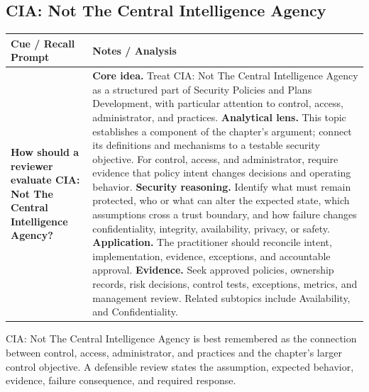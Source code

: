 \documentclass[11pt]{article}
\newcommand{\CornellHeader}{%
\rowcolor{Navy}\color{white}\bfseries Cue / Recall Prompt & \color{white}\bfseries Notes / Analysis\\\hline}
\newcommand{\CornellRow}[2]{%
\cellcolor{CueGray}\RaggedRight\textbf{#1} & \RaggedRight #2\\\hline}
\begin{document}
\subsection*{CIA: Not The Central Intelligence Agency}
\begin{longtable}{>{\RaggedRight\arraybackslash}p{}|>{\RaggedRight\arraybackslash}p{}}
\CornellHeader
\CornellRow{How should a reviewer evaluate CIA: Not The Central Intelligence Agency?}{\textbf{Core idea.} Treat CIA: Not The Central Intelligence Agency as a structured part of Security Policies and Plans Development, with particular attention to control, access, administrator, and practices. \textbf{Analytical lens.} This topic establishes a component of the chapter's argument; connect its definitions and mechanisms to a testable security objective. For control, access, and administrator, require evidence that policy intent changes decisions and operating behavior. \textbf{Security reasoning.} Identify what must remain protected, who or what can alter the expected state, which assumptions cross a trust boundary, and how failure changes confidentiality, integrity, availability, privacy, or safety. \textbf{Application.} The practitioner should reconcile intent, implementation, evidence, exceptions, and accountable approval. \textbf{Evidence.} Seek approved policies, ownership records, risk decisions, control tests, exceptions, metrics, and management review. Related subtopics include Availability, and Confidentiality.}
\end{longtable}
\begin{topicsummary}
CIA: Not The Central Intelligence Agency is best remembered as the connection between control, access, administrator, and practices and the chapter's larger control objective. A defensible review states the assumption, expected behavior, evidence, failure consequence, and required response.
\end{topicsummary}
\end{document}

